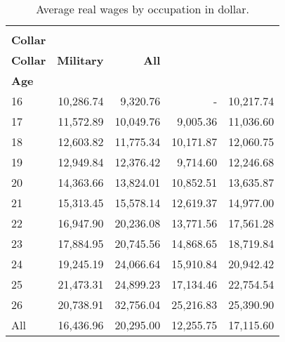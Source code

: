 \begin{ThreePartTable}

	\begin{longtable}[c]{@{}lrrrr@{}}
		\caption{Average real wages by occupation in dollar.}
		\label{tab:AverageWages}

		\setlength\extrarowheight{2.5pt}
		
		\\
		\toprule
       & \thead{\textbf{Blue-} \\ \textbf{Collar}}    & \thead{\textbf{White-} \\ \textbf{Collar}}  & \textbf{Military}  & \textbf{All}   \\
\textbf{Age} &        &         &  &       \\ \midrule
		\endfirsthead
		
16	&	10,286.74	&	9,320.76	&		- &	10,217.74 \\
17	&	11,572.89	&	10,049.76	&	9,005.36	&	11,036.60\\
18	&	12,603.82	&	11,775.34	&	10,171.87	&	12,060.75\\
19	&	12,949.84	&	12,376.42	&	9,714.60	&	12,246.68\\
20	&	14,363.66	&	13,824.01	&	10,852.51	&	13,635.87\\
21	&	15,313.45	&	15,578.14	&	12,619.37	&	14,977.00\\
22	&	16,947.90	&	20,236.08	&	13,771.56	&	17,561.28\\
23	&	17,884.95	&	20,745.56	&	14,868.65	&	18,719.84\\
24	&	19,245.19	&	24,066.64	&	15,910.84	&	20,942.42\\
25	&	21,473.31	&	24,899.23	&	17,134.46	&	22,754.54\\
26	&	20,738.91	&	32,756.04	&	25,216.83	&	25,390.90\\
All	&	16,436.96	&	20,295.00	&	12,255.75	&	17,115.60\\



  \bottomrule
	\end{longtable}
\end{ThreePartTable}
